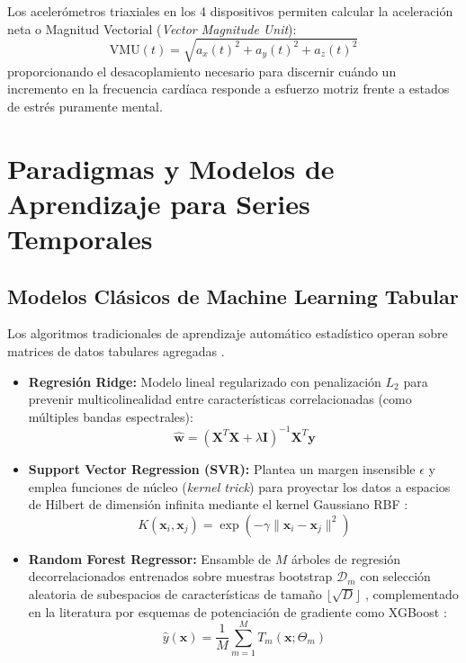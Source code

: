 Los acelerómetros triaxiales en los 4 dispositivos permiten calcular la aceleración neta o Magnitud Vectorial (\textit{Vector Magnitude Unit}):
\begin{equation}
    \text{VMU}(t) = \sqrt{a_x(t)^2 + a_y(t)^2 + a_z(t)^2}
\end{equation}
proporcionando el desacoplamiento necesario para discernir cuándo un incremento en la frecuencia cardíaca responde a esfuerzo motriz frente a estados de estrés puramente mental.



\section{Paradigmas y Modelos de Aprendizaje para Series Temporales}
\label{sec:teoria_modelos}

\subsection{Modelos Clásicos de Machine Learning Tabular}

Los algoritmos tradicionales de aprendizaje automático estadístico operan sobre matrices de datos tabulares agregadas \cite{hastie2009elements}.
\begin{itemize}
    \item \textbf{Regresión Ridge:} Modelo lineal regularizado con penalización $L_2$ para prevenir multicolinealidad entre características correlacionadas (como múltiples bandas espectrales):
    \begin{equation}
        \hat{\bm{w}} = (\bm{X}^T\bm{X} + \lambda \bm{I})^{-1}\bm{X}^T\bm{y}
    \end{equation}
    \item \textbf{Support Vector Regression (SVR):} Plantea un margen insensible $\epsilon$ y emplea funciones de núcleo (\textit{kernel trick}) para proyectar los datos a espacios de Hilbert de dimensión infinita mediante el kernel Gaussiano RBF \cite{cortes1995support}:
    \begin{equation}
        K(\bm{x}_i, \bm{x}_j) = \exp\left( -\gamma \|\bm{x}_i - \bm{x}_j\|^2 \right)
    \end{equation}
    \item \textbf{Random Forest Regressor:} Ensamble de $M$ árboles de regresión decorrelacionados entrenados sobre muestras bootstrap $\mathcal{D}_m$ con selección aleatoria de subespacios de características de tamaño $\lfloor \sqrt{D} \rfloor$ \cite{breiman2001random}, complementado en la literatura por esquemas de potenciación de gradiente como XGBoost \cite{chen2016xgboost}:
    \begin{equation}
        \hat{y}(\bm{x}) = \frac{1}{M} \sum_{m=1}^M T_m(\bm{x}; \Theta_m)
    \end{equation}
\end{itemize}

